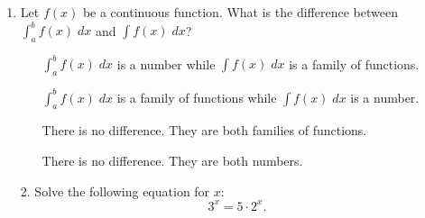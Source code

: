 \documentclass[11pt]{article}
\begin{document}
\pagestyle{empty}
\newsavebox{\quizfront}
\begin{lrbox}{\quizfront}
\begin{minipage}[top][4.5in][t]{\textwidth} \setlength{\parindent}{1.5em}
\drawtitle
\vspace{-0.5in}
\begin{enumerate}

\item Let $f(x)$ be a continuous function. What is the difference
  between $\int_a^b f(x) \; dx$ and $\int f(x)\; dx$?

  \vfill

  \begin{itemize}
  \item[\textbigcircle] $\int_a^b f(x)\;dx$ is a number while $\int
    f(x)\; dx$ is a family of functions.
    \vfill
  \item[\textbigcircle] $\int_a^b f(x)\;dx$ is a family of functions
    while $\int f(x)\; dx$ is a number.
    \vfill
  \item[\textbigcircle] There is no difference.  They are both
    families of functions.
    \vfill
  \item[\textbigcircle] There is no difference.  They are both
    numbers.
    \vfill
  \end{itemize}



\end{enumerate}



\end{minipage}
\end{lrbox}

\newsavebox{\quizback}
\begin{lrbox}{\quizback}
\begin{minipage}[top][4.5in][t]{\textwidth} \setlength{\parindent}{1.5em}
\begin{itemize}
\item[2.] Solve the following equation for $x$:
  \[
  3^x = 5\cdot 2^x.
  \]


\end{itemize}
\end{minipage}
\end{lrbox}

\noindent \usebox{\quizfront}
\vfill
\noindent \usebox{\quizfront}

\end{document}
